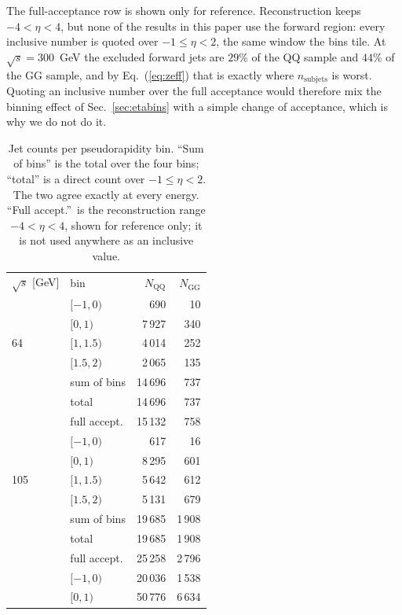 \documentclass[reprint,amsmath,amssymb,aps,prd,floatfix]{revtex4-2}
\begin{document}
The full-acceptance row is shown only for reference. Reconstruction keeps
$-4 < \eta < 4$, but none of the results in this paper use the forward region:
every inclusive number is quoted over $-1 \le \eta < 2$, the same window the
bins tile. At $\sqrt{s} = 300$~GeV the excluded forward jets are $29\%$ of the
QQ sample and $44\%$ of the GG sample, and by Eq.~(\ref{eq:zeff}) that is
exactly where $n_{\mathrm{subjets}}$ is worst. Quoting an inclusive number over
the full acceptance would therefore mix the binning effect of
Sec.~\ref{sec:etabins} with a simple change of acceptance, which is why we do
not do it.

\begin{table}[htbp]
\caption{Jet counts per pseudorapidity bin. ``Sum of bins'' is the total over
the four bins; ``total'' is a direct count over $-1 \le \eta < 2$. The two
agree exactly at every energy. ``Full accept.''\ is the reconstruction range
$-4 < \eta < 4$, shown for reference only; it is not used anywhere as an
inclusive value.}
\label{tab:jetcounts}
\begin{ruledtabular}
\begin{tabular}{llrr}
$\sqrt{s}$ [GeV] & bin & $N_{\mathrm{QQ}}$ & $N_{\mathrm{GG}}$ \\
\colrule
    & $[-1, 0)$    &  \phantom{0}\phantom{0}690 & \phantom{00}10 \\
    & $[0, 1)$     &  7\,927 &   340 \\
 64 & $[1, 1.5)$   &  4\,014 &   252 \\
    & $[1.5, 2)$   &  2\,065 &   135 \\
    & sum of bins  & 14\,696 &   737 \\
    & total        & 14\,696 &   737 \\
    & full accept. & 15\,132 &   758 \\
\colrule
    & $[-1, 0)$    &    617 &    16 \\
    & $[0, 1)$     &  8\,295 &   601 \\
105 & $[1, 1.5)$   &  5\,642 &   612 \\
    & $[1.5, 2)$   &  5\,131 &   679 \\
    & sum of bins  & 19\,685 & 1\,908 \\
    & total        & 19\,685 & 1\,908 \\
    & full accept. & 25\,258 & 2\,796 \\
\colrule
    & $[-1, 0)$    & 20\,036 & 1\,538 \\
    & $[0, 1)$     & 50\,776 & 6\,634 \\

\end{tabular}
\end{ruledtabular}
\end{table}
\end{document}
